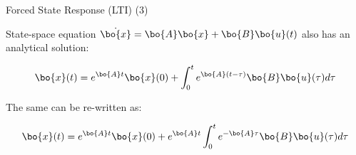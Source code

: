 \documentclass{beamer}
\begin{document}
\begin{frame}{Forced State Response (LTI) (3)}
	\begin{flushleft}
		
		State-space equation $\dot{\bo{x}} = \bo{A}  \bo{x} + \bo{B}  \bo{u}(t)$ also has an analytical solution:
		
		\begin{equation}
			\bo{x}(t) = e^{\bo{A}t}  \bo{x}(0) + 
			\int_{0}^{t} e^{\bo{A}(t-\tau)} \bo{B}  \bo{u}(\tau) d\tau
		\end{equation}
		
		The same can be re-written as:
		
		\begin{equation}
			\bo{x}(t) = e^{\bo{A}t}  \bo{x}(0) + 
			e^{\bo{A}t} \int_{0}^{t} e^{-\bo{A}\tau} \bo{B}  \bo{u}(\tau) d\tau
		\end{equation}
		
	\end{flushleft}
\end{frame}
\end{document}

